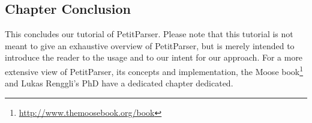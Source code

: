 \documentclass[a4paper,10pt,twoside]{book}
\begin{document}
\subsection{Chapter Conclusion}

This concludes our tutorial of PetitParser. Please note that this
tutorial is not meant to give an exhaustive overview of PetitParser,
but is merely intended to introduce the reader to the usage and to our
intent for our approach. For a more extensive view of PetitParser, its
concepts and implementation, the Moose
book\footnote{\url{http://www.themoosebook.org/book}} and Lukas
Renggli's PhD have a dedicated chapter dedicated.

\ifx\wholebook\relax\else
   
   
\end{document}
